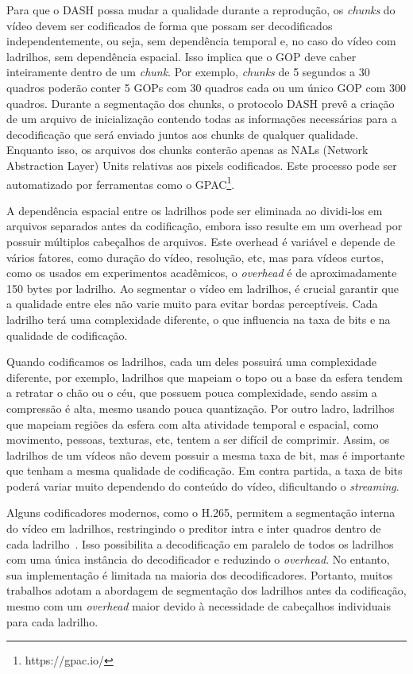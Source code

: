 Para que o DASH possa mudar a qualidade durante a reprodução, os \textit{chunks} do vídeo devem ser codificados de forma que possam ser decodificados independentemente, ou seja, sem dependência temporal e, no caso do vídeo com ladrilhos, sem dependência espacial. Isso implica que o GOP deve caber inteiramente dentro de um \textit{chunk}. Por exemplo, \textit{chunks} de 5 segundos a 30 quadros poderão conter 5 GOPs com 30 quadros cada ou um único GOP com 300 quadros. Durante a segmentação dos chunks, o protocolo DASH prevê a criação de um arquivo de inicialização contendo todas as informações necessárias para a decodificação que será enviado juntos aos chunks de qualquer qualidade. Enquanto isso, os arquivos dos chunks conterão apenas as NALs (Network Abstraction Layer) Units relativas aos pixels codificados. Este processo pode ser automatizado por ferramentas como o GPAC\footnote{https://gpac.io/}.

A dependência espacial entre os ladrilhos pode ser eliminada ao dividi-los em arquivos separados antes da codificação, embora isso resulte em um overhead por possuir múltiplos cabeçalhos de arquivos. Este overhead é variável e depende de vários fatores, como duração do vídeo, resolução, etc, mas para vídeos curtos, como os usados em experimentos acadêmicos, o \textit{overhead} é de aproximadamente 150 bytes por ladrilho. Ao segmentar o vídeo em ladrilhos, é crucial garantir que a qualidade entre eles não varie muito para evitar bordas perceptíveis. Cada ladrilho terá uma complexidade diferente, o que influencia na taxa de bits e na qualidade de codificação.

Quando codificamos os ladrilhos, cada um deles possuirá uma complexidade diferente, por exemplo, ladrilhos que mapeiam o topo ou a base da esfera tendem a retratar o chão ou o céu, que possuem pouca complexidade, sendo assim a compressão é alta, mesmo usando pouca quantização. Por outro ladro, ladrilhos que mapeiam regiões da esfera com alta atividade temporal e espacial, como movimento, pessoas, texturas, etc, tentem a ser difícil de comprimir. Assim, os ladrilhos de um vídeos não devem possuir a mesma taxa de bit, mas é importante que tenham a mesma qualidade de codificação. Em contra partida, a taxa de bits poderá variar muito dependendo do conteúdo do vídeo, dificultando o \textit{streaming}.

Alguns codificadores modernos, como o H.265, permitem a segmentação interna do vídeo em ladrilhos, restringindo o preditor intra e inter quadros dentro de cada ladrilho~\cite{ITU-T2018}. Isso possibilita a decodificação em paralelo de todos os ladrilhos com uma única instância do decodificador e reduzindo o \textit{overhead}. No entanto, sua implementação é limitada na maioria dos decodificadores. Portanto, muitos trabalhos adotam a abordagem de segmentação dos ladrilhos antes da codificação, mesmo com um \textit{overhead} maior devido à necessidade de cabeçalhos individuais para cada ladrilho.

